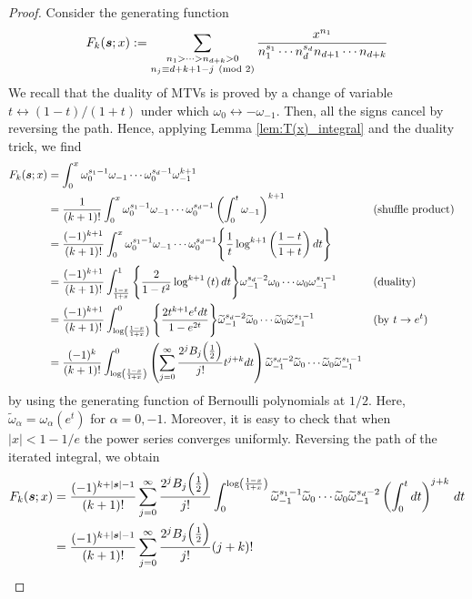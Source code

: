 \documentclass{article}
\newcommand{\ga}{\alpha}
\newcommand\om{{\omega}}
\newcommand\tom{{\widetilde{\omega}}}
\newcommand{\bfs}{{\boldsymbol{\sl{s}}}}
\theoremstyle{plain}
\theoremstyle{definition}
\begin{document}
\begin{proof}
Consider the generating function
\begin{equation*}
F_k(\bfs;x):=\sum_{\substack{n_1>\cdots >n_{d+k}>0\\ n_j\equiv d+k+1-j\pmod 2}}\frac{x^{n_1}}{n_1^{s_1}\cdots n_d^{s_d}n_{d+1}\cdots n_{d+k}}
\end{equation*}
We recall that the duality of MTVs is proved by a change of variable $t\leftrightarrow  (1-t)/(1+t)$ under which $\om_0 \leftrightarrow -\om_{-1}$. Then, all the signs cancel by reversing the path.
Hence, applying Lemma \ref{lem:T(x)_integral} and the duality trick, we find
\begin{alignat*}{4}
F_k(\bfs;x)&=\int_0^{x}\om_0^{s_1-1}\om_{-1}\cdots\om_0^{s_d-1}\om_{-1}^{k+1}\\
&=\frac{1}{(k+1)!}\int_0^x\om_0^{s_1-1}\om_{-1}\cdots\om_0^{s_d-1}\left(\int_0^{t} \om_{-1}\right)^{k+1} \quad &&\text{(shuffle product)}\\
&=\frac{(-1)^{k+1}}{(k+1)!}\int_0^x\om_0^{s_1-1}\om_{-1}\cdots\om_0^{s_d-1}\Bigg\{\frac{1}{t}\log^{k+1}\left(\frac{1-t}{1+t}\right)dt\Bigg\}\\
&=\frac{(-1)^{k+1}}{(k+1)!}\int_{\frac{1-x}{1+x}}^{1}\Bigg\{\frac{2}{1-t^2}\log^{k+1}\left(t\right)dt\Bigg\}\om_{-1}^{s_d-2} \om_0\cdots\om_0\om_{-1}^{s_1-1} \quad&&\text{(duality)}\\
&=\frac{(-1)^{k+1}}{(k+1)!}\int_{\log\left(\frac{1-x}{1+x}\right)}^{0}
\Bigg\{\frac{2t^{k+1}e^tdt}{1-e^{2t}}\Bigg\}\tom_{-1}^{s_d-2} \tom_0\cdots\tom_0\tom_{-1}^{s_1-1}  \quad &&(\text{by }t\to e^t) \\
&=\frac{(-1)^{k}}{(k+1)!}\int_{\log\left(\frac{1-x}{1+x}\right)}^{0}
\left(\sum_{j=0}^{\infty}\frac{2^jB_j\Big(\frac12\Big)}{j!}t^{j+k} dt\right) \tom_{-1}^{s_d-2} \tom_0\cdots\tom_0\tom_{-1}^{s_1-1} &&
\end{alignat*}
by using the generating function of Bernoulli polynomials at $1/2$. Here, $\tom_\ga=\om_\ga(e^t)$ for $\ga=0,-1.$ Moreover, it is easy to check that when $|x|<1-1/e$ the power series converges uniformly. Reversing the path of the iterated integral, we obtain
\begin{alignat*}{4}
F_k(\bfs;x)&=\frac{(-1)^{k+|\bfs|-1}}{(k+1)!}\sum_{j=0}^{\infty}\frac{2^jB_j\Big(\frac12\Big)}{j!} \int_0^{\log\left(\frac{1-x}{1+x}\right)}\tom_{-1}^{s_1-1}\tom_0\cdots
 \tom_0\tom_{-1}^{s_d-2}\left(\int_0^t dt\right)^{j+k} \,dt\\
&=\frac{(-1)^{k+|\bfs|-1}}{(k+1)!}\sum_{j=0}^{\infty}\frac{2^jB_j\Big(\frac12\Big)}{j!}(j+k)!

\end{alignat*}
\end{proof}
\end{document}
